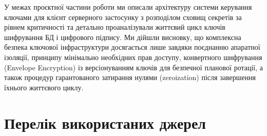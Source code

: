 \documentclass[12pt,a4paper]{article}
\begin{document}
У межах проєктної частини роботи ми описали архітектуру системи керування ключами для клієнт
серверного застосунку з розподілом сховищ секретів за рівнем критичності та детально проаналізували
життєвий цикл ключів шифрування БД і цифрового підпису. Ми дійшли висновку, що комплексна безпека
ключової інфраструктури досягається лише завдяки поєднанню апаратної ізоляції, принципу мінімально
необхідних прав доступу, конвертного шифрування (Envelope Encryption) із версіонуванням ключів для
безпечної планової ротації, а також процедур гарантованого затирання нулями (zeroization) після завершення
їхнього життєвого циклу.


\section*{Перелік використаних джерел}
\end{document}
